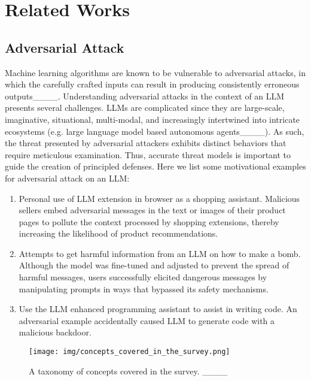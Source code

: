 \section{Related Works}
\subsection{Adversarial Attack}
Machine learning algorithms are known to be vulnerable to adversarial attacks, in which the carefully crafted inputs can result in producing consistently erroneous outputs____. Understanding adversarial attacks in the context of an LLM presents several challenges.
LLMs are complicated since they are large-scale, imaginative, situational, multi-modal, and increasingly intertwined into intricate ecosystems (e.g. large language model based autonomous agents____). As such, the threat presented by adversarial attackers exhibits distinct behaviors that require meticulous examination. Thus, accurate threat models is important to guide the creation of principled defenses. Here we list some motivational examples for adversarial attack on an LLM:
\begin{enumerate}
    \item Personal use of LLM extension in browser as a shopping assistant. Malicious sellers embed adversarial messages in the text or images of their product pages to pollute the context processed by shopping extensions, thereby increasing the likelihood of product recommendations.
    \item Attempts to get harmful information from an LLM on how to make a bomb. Although the model was fine-tuned and adjusted to prevent the spread of harmful messages, users successfully elicited dangerous messages by manipulating prompts in ways that bypassed its safety mechanisms.
    \item Use the LLM enhanced programming assistant to assist in writing code.  An adversarial example accidentally caused LLM to generate code with a malicious backdoor.
\end{enumerate}

\begin{figure}[htbp]
    \centering
    \texttt{[image: img/concepts\_covered\_in\_the\_survey.png]}
    \caption{A taxonomy of concepts covered in the survey. ____}
    \label{fig:taxonomy_concepts}
\end{figure}

